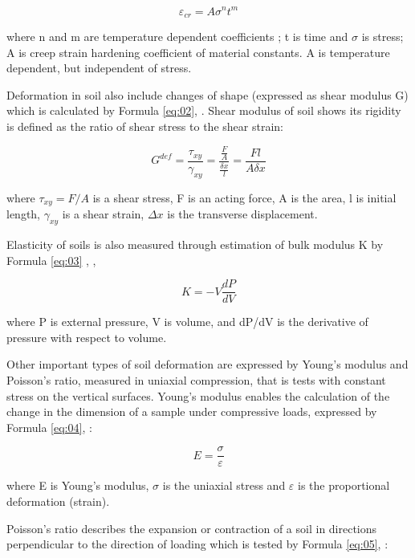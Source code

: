 \documentclass[a4paper,10pt]{article}
\begin{document}
\begin{equation}
	\varepsilon_{cr}=A\sigma^{n}t^{m}
\end{equation}\label{eq:01}

where n and m are temperature dependent coefficients ; t is time and $\sigma$ is stress; A is creep strain hardening coefficient of material constants. A is temperature dependent, but independent of stress. 

Deformation in soil also include changes of shape (expressed as shear modulus G) which is calculated by Formula \ref{eq:02}, \cite{Millsetal1996}. Shear modulus of soil shows its rigidity is defined as the ratio of shear stress to the shear strain:

\begin{equation}
	G^{def}=\frac{\tau_{xy}}{\gamma_{xy}}=\frac{\frac{F}{A}}{\frac{\delta x}{l}}=\frac{Fl}{A\delta x}
\end{equation}\label{eq:02}

where $\tau_{{xy}}=F/A$ is a shear stress, F is an acting force, A is the area, l is initial length, $\gamma_{xy}$ is a shear strain, $\Delta x$ is the transverse displacement. 

Elasticity of soils is also measured through estimation of bulk modulus K by Formula \ref{eq:03} \cite{Bezukhov1968}, \cite{FredlundRahardjo},  

\begin{equation}
	K=-V\frac{dP}{dV}
\end{equation}\label{eq:03}

where P is external pressure, V is volume, and dP/dV is the derivative of pressure with respect to volume.

Other important types of soil deformation are expressed by Young's modulus and Poisson's ratio, measured in uniaxial compression, that is tests with constant stress on the vertical surfaces. Young's modulus enables the calculation of the change in the dimension of a sample under compressive loads, expressed by Formula \ref{eq:04}, \cite{Millsetal1996}:  

\begin{equation}
	E=\frac{\sigma}{\varepsilon}
\end{equation}\label{eq:04}

where E is Young's modulus, $\sigma$ is the uniaxial stress and $\varepsilon$ is the proportional deformation (strain). 

Poisson's ratio describes the expansion or contraction of a soil in directions perpendicular to the direction of loading which is tested by Formula \ref{eq:05}, \cite{Millsetal1996}:  
\end{document}
